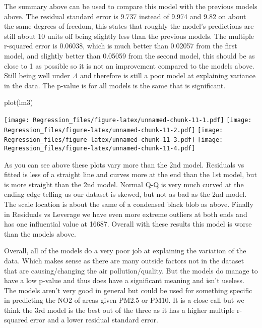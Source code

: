 \documentclass[
]{article}
\newenvironment{Shaded}{\begin{snugshade}}{\end{snugshade}}
\newcommand{\FunctionTok}[1]{\textcolor[rgb]{0.00,0.00,0.00}{#1}}
\newcommand{\NormalTok}[1]{#1}
\begin{document}
The summary above can be used to compare this model with the previous
models above. The residual standard error is 9.737 instead of 9.974 and
9.82 on about the same degrees of freedom, this states that roughly the
model's predictions are still about 10 units off being slightly less
than the previous models. The multiple r-squared error is 0.06038, which
is much better than 0.02057 from the first model, and slightly better
than 0.05059 from the second model, this should be as close to 1 as
possible so it is not an improvement compared to the models above. Still
being well under .4 and therefore is still a poor model at explaining
variance in the data. The p-value is for all models is the same that is
significant.

\begin{Shaded}
\begin{Highlighting}[]
\FunctionTok{plot}\NormalTok{(lm3)}
\end{Highlighting}
\end{Shaded}

\texttt{[image: Regression\_files/figure-latex/unnamed-chunk-11-1.pdf]}
\texttt{[image: Regression\_files/figure-latex/unnamed-chunk-11-2.pdf]}
\texttt{[image: Regression\_files/figure-latex/unnamed-chunk-11-3.pdf]}
\texttt{[image: Regression\_files/figure-latex/unnamed-chunk-11-4.pdf]}

As you can see above these plots vary more than the 2nd model. Residuals
vs fitted is less of a straight line and curves more at the end than the
1st model, but is more straight than the 2nd model. Normal Q-Q is very
much curved at the ending edge telling us our dataset is skewed, but not
as bad as the 2nd model. The scale location is about the same of a
condensed black blob as above. Finally in Residuals vs Leverage we have
even more extreme outliers at both ends and has one influential value at
16687. Overall with these results this model is worse than the models
above.

Overall, all of the models do a very poor job at explaining the
variation of the data. Which makes sense as there are many outside
factors not in the dataset that are causing/changing the air
pollution/quality. But the models do manage to have a low p-value and
thus does have a significant meaning and isn't useless. The models
aren't very good in general but could be used for something specific in
predicting the NO2 of areas given PM2.5 or PM10. It is a close call but
we think the 3rd model is the best out of the three as it has a higher
multiple r-squared error and a lower residual standard error.
\end{document}
